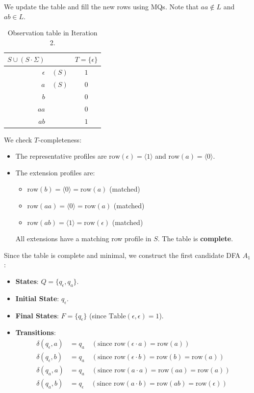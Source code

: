 We update the table and fill the new rows using MQs. Note that $aa \notin L$ and $ab \in L$.

\begin{table}[H]
  \centering
  \begin{tabular}{rcc}
    \toprule
    $S \cup (S \cdot \Sigma)$ & & $T = \{\epsilon\}$ \\
    \midrule
    $\epsilon$ & $(S)$ & $1$ \\
    $a$ & $(S)$ & $0$ \\
    \midrule
    $b$ & & $0$ \\
    $aa$ & & $0$ \\
    $ab$ & & $1$ \\
    \bottomrule
  \end{tabular}
  \caption{Observation table in Iteration 2.}
  \label{tab:iter2}
\end{table}

We check $T$-completeness:
\begin{itemize}
  \item The representative profiles are $\text{row}(\epsilon) = \langle 1 \rangle$ and $\text{row}(a) = \langle 0 \rangle$.
  \item The extension profiles are:
  \begin{itemize}
    \item $\text{row}(b) = \langle 0 \rangle = \text{row}(a)$ (matched)
    \item $\text{row}(aa) = \langle 0 \rangle = \text{row}(a)$ (matched)
    \item $\text{row}(ab) = \langle 1 \rangle = \text{row}(\epsilon)$ (matched)
  \end{itemize}
  All extensions have a matching row profile in $S$. The table is \textbf{complete}.
\end{itemize}

Since the table is complete and minimal, we construct the first candidate DFA $A_1$:
\begin{itemize}
  \item \textbf{States}: $Q = \{q_\epsilon, q_a\}$.
  \item \textbf{Initial State}: $q_\epsilon$.
  \item \textbf{Final States}: $F = \{q_\epsilon\}$ (since $\text{Table}(\epsilon, \epsilon) = 1$).
  \item \textbf{Transitions}:
  \begin{align*}
    \delta(q_\epsilon, a) &= q_a \quad (\text{since } \text{row}(\epsilon \cdot a) = \text{row}(a)) \\
    \delta(q_\epsilon, b) &= q_a \quad (\text{since } \text{row}(\epsilon \cdot b) = \text{row}(b) = \text{row}(a)) \\
    \delta(q_a, a) &= q_a \quad (\text{since } \text{row}(a \cdot a) = \text{row}(aa) = \text{row}(a)) \\
    \delta(q_a, b) &= q_\epsilon \quad (\text{since } \text{row}(a \cdot b) = \text{row}(ab) = \text{row}(\epsilon))
  \end{align*}
\end{itemize}


